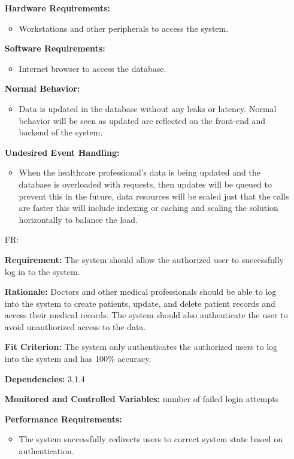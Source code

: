 \documentclass[12pt]{article}
\newcounter{reqnum} %
\begin{document}
\begin{itemize}
\textbf{Hardware Requirements:}
\begin{itemize}
  \item Workstations and other peripherals to access the system.
\end{itemize} 

\textbf{Software Requirements:}
\begin{itemize}
  \item Internet browser to access the database.
\end{itemize} 

\textbf{Normal Behavior:}
\begin{itemize}
  \item Data is updated in the database without any leaks or latency. Normal behavior will be seen as updated are reflected on the front-end and backend of the system.
\end{itemize} 

\textbf{Undesired Event Handling:}
\begin{itemize}
  \item When the healthcare professional’s data is being updated and the database is overloaded with requests, then updates will be queued to prevent this in the future, data resources will be scaled just that the calls are faster this will include indexing or caching and scaling the solution horizontally to balance the load.
\end{itemize} 

\item[FR\refstepcounter{reqnum}\thereqnum \label{FR_login}:]

\textbf{Requirement:} The system should allow the authorized user to successfully log in to the system.

\textbf{Rationale:} Doctors and other medical professionals should be able to log into the system to create patients, update, and delete patient records and access their medical records. The system should also authenticate the user to avoid unauthorized access to the data.

\textbf{Fit Criterion:} The system only authenticates the authorized users to log into the system and has 100\% accuracy. 

\textbf{Dependencies:}  3.1.4

\textbf{Monitored and Controlled Variables:} number of failed login attempts

\textbf{Performance Requirements:} 
\begin{itemize}
  \item The system successfully redirects users to correct system state based on authentication.
\end{itemize}


\end{itemize}
\end{document}

